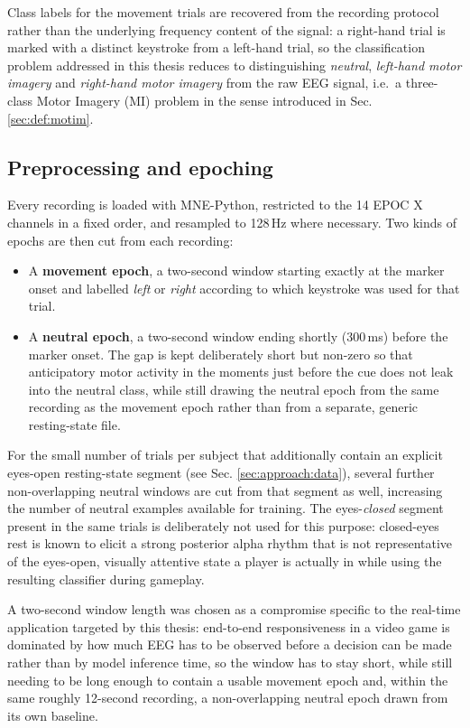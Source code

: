 Class labels for the movement trials are recovered from the recording protocol rather than the underlying frequency content of the signal: a right-hand trial is marked with a distinct keystroke from a left-hand trial, so the classification problem addressed in this thesis reduces to distinguishing \emph{neutral}, \emph{left-hand motor imagery} and \emph{right-hand motor imagery} from the raw EEG signal, i.e.\ a three-class Motor Imagery (MI) problem in the sense introduced in Sec. \ref{sec:def:motim}.

\subsection{Preprocessing and epoching}
\label{sec:approach:preprocessing}

Every recording is loaded with MNE-Python, restricted to the 14 EPOC X channels in a fixed order, and resampled to 128\,Hz where necessary. Two kinds of epochs are then cut from each recording:

\begin{itemize}
    \item A \textbf{movement epoch}, a two-second window starting exactly at the marker onset and labelled \emph{left} or \emph{right} according to which keystroke was used for that trial.
    \item A \textbf{neutral epoch}, a two-second window ending shortly (300\,ms) before the marker onset. The gap is kept deliberately short but non-zero so that anticipatory motor activity in the moments just before the cue does not leak into the neutral class, while still drawing the neutral epoch from the same recording as the movement epoch rather than from a separate, generic resting-state file.
\end{itemize}

For the small number of trials per subject that additionally contain an explicit eyes-open resting-state segment (see Sec. \ref{sec:approach:data}), several further non-overlapping neutral windows are cut from that segment as well, increasing the number of neutral examples available for training. The eyes-\emph{closed} segment present in the same trials is deliberately not used for this purpose: closed-eyes rest is known to elicit a strong posterior alpha rhythm that is not representative of the eyes-open, visually attentive state a player is actually in while using the resulting classifier during gameplay.

A two-second window length was chosen as a compromise specific to the real-time application targeted by this thesis: end-to-end responsiveness in a video game is dominated by how much EEG has to be observed before a decision can be made rather than by model inference time, so the window has to stay short, while still needing to be long enough to contain a usable movement epoch and, within the same roughly 12-second recording, a non-overlapping neutral epoch drawn from its own baseline.

